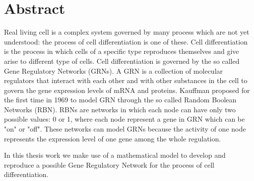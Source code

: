 
\chapter*{Abstract}

Real living cell is a complex system governed by many process which are not yet understood: the process of cell differentiation is one of these. 
Cell  differentiation is the process in which cells of a specific type reproduces themselves and give arise to different type of cells.
Cell differentiation is governed by the so called Gene Regulatory Networks (GRNs).
A GRN is a collection of molecular regulators that interact with each other and with other substances in the cell to govern the gene expression levels of mRNA and proteins. 
Kauffman proposed for the first time in 1969 to model GRN through the so called Random Boolean Networks (RBN).
RBNs are networks in which each node can have only two possible values: 0 or 1, where each node represent a gene in GRN which can be "on" or "off".
These networks can model GRNs because the activity of one node represents the expression level of one gene among the whole regulation.

In this thesis work we make use of a mathematical model to develop and reproduce a possible Gene Regulatory Network for the process of cell differentiation.

